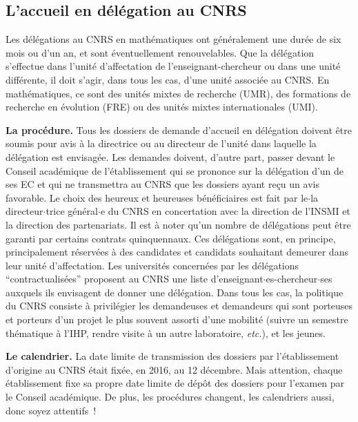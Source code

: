 \subsection*{L'accueil en d\'el\'egation au CNRS}


Les d\'el\'egations au CNRS en math\'ematiques ont g\'en\'eralement
une dur\'ee de six mois ou d'un an, et sont \'eventuellement
renouvelables. Que la d\'el\'egation s'effectue dans l'unit\'e
d'affectation de l'enseignant-chercheur ou dans une unit\'e
diff\'erente, il doit s'agir, dans tous les cas, d'une unit\'e
associ\'ee au CNRS. En math\'ematiques, ce sont des unit\'es mixtes de
recherche (UMR), des formations de recherche en \'evolution (FRE)
ou des unit\'es mixtes internationales (UMI).

\textbf{La proc\'edure.} Tous les dossiers de demande d'accueil en
d\'el\'egation doivent \^etre soumis pour avis \`a la directrice ou au directeur de
l'unit\'e dans laquelle la d\'el\'egation est envisag\'ee. Les
demandes doivent, d'autre part, passer devant le Conseil
acad\'emique de l'\'etablissement qui se prononce sur la d\'el\'egation d'un de ses EC
et qui ne transmettra au CNRS que les dossiers ayant re\c cu un
avis favorable. Le choix des heureux et heureuses b\'en\'eficiaires est fait par
le$\cdot$la directeur$\cdot$trice g\'en\'eral$\cdot$e du CNRS en concertation avec la direction
de l'INSMI et la direction des partenariats. Il est \`a noter
qu'un nombre de d\'el\'egations peut \^etre garanti par certains
contrats quinquennaux. Ces d\'el\'egations sont, en principe,
principalement r\'eserv\'ees \`a des candidates et candidats souhaitant demeurer
dans leur unit\'e d'affectation. Les universit\'es concern\'ees par
les d\'el\'egations ``contractualis\'ees'' proposent au CNRS
une liste d'enseignant$\cdot$es-chercheur$\cdot$ses auxquels ils envisagent de donner
une d\'el\'egation. Dans tous les cas, la politique du CNRS consiste
\`a privil\'egier les demandeuses et demandeurs qui sont porteuses et porteurs d'un projet le plus souvent
assorti d'une mobilit\'e (suivre un semestre th\'ematique \`a l'IHP,
rendre visite \`a un autre laboratoire, {\em etc.}), et les jeunes. 

\textbf{Le calendrier.} La date limite de transmission des dossiers
par l'\'etablissement d'origine au CNRS \'etait fix\'ee, en 2016, au
12 d\'ecembre. Mais attention, chaque \'etablissement fixe sa propre
date limite de d\'ep\^ot des dossiers pour l'examen par le Conseil
acad\'emique. De plus, les proc\'edures changent, les
calendriers aussi, donc soyez attentifs~! \\

